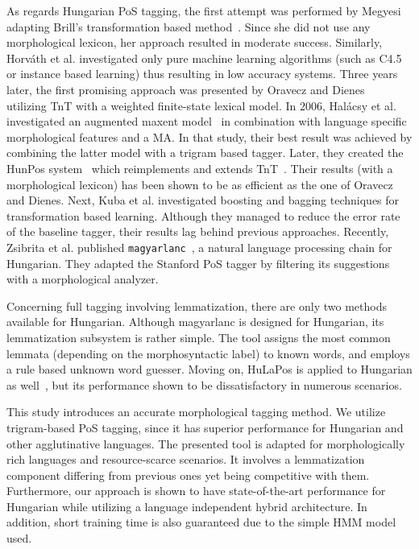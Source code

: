 As regards Hungarian PoS tagging, the first attempt was performed by Megyesi~\cite{Megyesi1998} adapting Brill’s transformation based method~\cite{Brill1992}.
Since she did not use any morphological lexicon, her approach resulted in moderate success.
Similarly, Horváth et al. investigated \cite{Horvath1999} only pure machine learning algorithms (such as C4.5 or instance based learning) thus resulting in low accuracy systems.
Three years later, the first promising approach was presented by Oravecz and Dienes~\cite{Oravecz2002a} utilizing TnT with a weighted finite-state lexical model.
In 2006, Halácsy et al. investigated an augmented maxent model~\cite{Halacsy2006} in combination with language specific morphological features and a MA.
In that study, their best result was achieved by combining the latter model with a trigram based tagger.
Later, they created the HunPos system~\cite{Halacsy2007} which reimplements and extends TnT~\cite{Brants2000}.
Their results (with a morphological lexicon) has been shown to be as efficient as the one of Oravecz and Dienes.
Next, Kuba et al. investigated boosting and bagging techniques for transformation based learning.
Although they managed to reduce the error rate of the baseline tagger, their results lag behind previous approaches.
Recently, Zsibrita et al. published \texttt{magyarlanc}~\cite{zsibrata2013magyarlanc}, a natural language processing chain for Hungarian.
They adapted the Stanford PoS tagger by filtering its suggestions with a morphological analyzer. 

Concerning full tagging involving lemmatization, there are only two methods available for Hungarian.
Although magyarlanc is designed for Hungarian, its lemmatization subsystem is rather simple.
The tool assigns the most common lemmata (depending on the morphosyntactic label) to known words, and employs a rule based unknown word guesser.
Moving on, HuLaPos is applied to Hungarian as well~\cite{Laki2013}, but its performance shown to be dissatisfactory in numerous scenarios. 

This study introduces an accurate morphological tagging method.
We utilize trigram-based PoS tagging, since it has superior performance for Hungarian and other agglutinative languages.
The presented tool is adapted for morphologically rich languages and resource-scarce scenarios.
It involves a lemmatization component differing from previous ones yet being competitive with them.
Furthermore, our approach is shown to have state-of-the-art performance for Hungarian while utilizing a language independent hybrid architecture.
In addition, short training time is also guaranteed due to the simple HMM model used.



